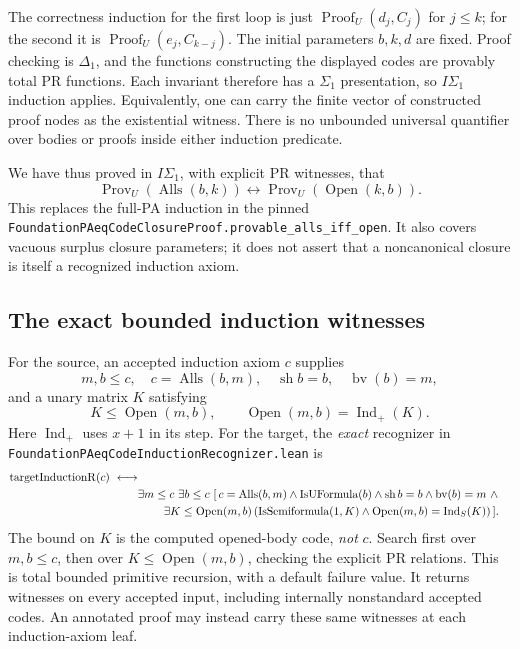 The correctness induction for the first loop is just
$\operatorname{Proof}_U(d_j,C_j)$ for $j\le k$; for the second it is
$\operatorname{Proof}_U(e_j,C_{k-j})$.  The initial parameters $b,k,d$
are fixed.  Proof checking is $\Delta_1$, and the functions constructing
the displayed codes are provably total PR functions.  Each invariant
therefore has a $\Sigma_1$ presentation, so $I\Sigma_1$ induction applies.
Equivalently, one can carry the finite vector of constructed proof nodes
as the existential witness.  There is no unbounded universal quantifier
over bodies or proofs inside either induction predicate.

We have thus proved in $I\Sigma_1$, with explicit PR witnesses, that
\[
 \operatorname{Prov}_U(\operatorname{Alls}(b,k))
 \longleftrightarrow \operatorname{Prov}_U(\operatorname{Open}(k,b)) .\tag{OC}
\]
This replaces the full-PA induction in the pinned
\texttt{FoundationPAeqCodeClosureProof.provable\_alls\_iff\_open}.
It also covers vacuous surplus closure parameters; it does not assert
that a noncanonical closure is itself a recognized induction axiom.

\subsection{The exact bounded induction witnesses}

For the source, an accepted induction axiom $c$ supplies
\[
 m,b\le c,\quad c=\operatorname{Alls}(b,m),\quad
 \operatorname{sh}b=b,\quad\operatorname{bv}(b)=m,
\]
and a unary matrix $K$ satisfying
\[
 K\le\operatorname{Open}(m,b),\qquad
 \operatorname{Open}(m,b)=\operatorname{Ind}_{+}(K).
\]
Here $\operatorname{Ind}_{+}$ uses $x+1$ in its step.
For the target, the \emph{exact} recognizer in
\texttt{FoundationPAeqCodeInductionRecognizer.lean} is
\begin{align*}
\operatorname{targetInductionR}(c)\ \longleftrightarrow\\
 &\exists m\le c\ \exists b\le c\ [\,
  c=\operatorname{Alls}(b,m)\land\operatorname{IsUFormula}(b)\land
  \operatorname{sh}b=b\land\operatorname{bv}(b)=m\ \land\\
 &\hspace{8mm}\exists K\le\operatorname{Open}(m,b)\,
  (\operatorname{IsSemiformula}(1,K)\land
   \operatorname{Open}(m,b)=\operatorname{Ind}_{S}(K))\,].
\end{align*}
The bound on $K$ is the computed opened-body code, \emph{not} $c$.
Search first over $m,b\le c$, then over
$K\le\operatorname{Open}(m,b)$, checking the explicit PR relations.
This is total bounded primitive recursion, with a default failure value.
It returns witnesses on every accepted input, including internally
nonstandard accepted codes.  An annotated proof may instead carry these
same witnesses at each induction-axiom leaf.


